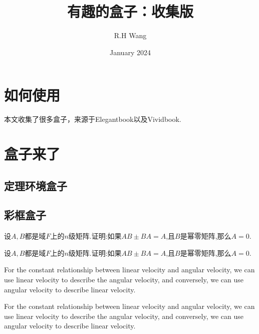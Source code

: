 \documentclass[a4]{ctexart}
\title{有趣的盒子：收集版}
\author{R.H Wang}
\date{January 2024}
\begin{document}
\maketitle
\section{如何使用}
本文收集了很多盒子，来源于Elegantbook以及Vividbook. 

\section{盒子来了}



\subsection{定理环境盒子}



\subsection{彩框盒子}
\begin{mybox1}
    设$A,B$都是域$F$上的$n$级矩阵.证明:如果$AB\pm BA=A$,且$B$是幂零矩阵,那么$A=0$.
\end{mybox1}

\begin{tcblisting}{}
\begin{mybox1}
    设$A,B$都是域$F$上的$n$级矩阵.证明:如果$AB\pm BA=A$,且$B$是幂零矩阵,那么$A=0$.
\end{mybox1}
\end{tcblisting}


\begin{marker}
    For the constant relationship between linear velocity and angular velocity, we can use linear velocity to describe the angular velocity, and conversely, we can use angular velocity to describe linear velocity.
\end{marker}

\begin{tcblisting}{}
\begin{marker}
    For the constant relationship between linear velocity and angular velocity, we can use linear velocity to describe the angular velocity, and conversely, we can use angular velocity to describe linear velocity.
\end{marker}
\end{tcblisting}
\end{document}
